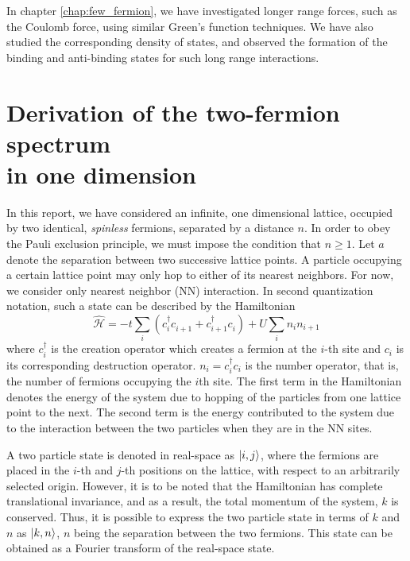 \documentclass[a4paper, 11pt]{report}
\begin{document}
In chapter \ref{chap:few_fermion}, we have investigated longer range forces, such as the Coulomb force, using similar Green's function techniques. We have also studied the corresponding density of states, and observed the formation of the binding and anti-binding states for such long range interactions.

\section{Derivation of the two-fermion spectrum\\in one dimension}\label{sec:Derivations}
In this report, we have considered an infinite, one dimensional lattice, occupied by two identical, \textit{spinless} fermions, separated by a distance $n$. In order to obey the Pauli exclusion principle, we must impose the condition that $ n \geq 1 $. Let $a$ denote the separation between two successive lattice points. A particle occupying a certain lattice point may only hop to either of its nearest neighbors. For now, we consider only nearest neighbor (NN) interaction. In second quantization notation, such a state can be described by the Hamiltonian
\begin{equation}\label{eqn:Hamiltonian}
\hat{\mathcal{H}} = -t \sum_{i}\left( c^{\dagger}_{i} c^{}_{i + 1} + c^{\dagger}_{i + 1} c^{}_{i} \right) + U \sum_{i} n_i n_{i + 1}
\end{equation}
where $c^{\dagger}_{i}$ is the creation operator which creates a fermion at the $i$-th site and $c_{i}$ is its corresponding destruction operator. $n_i = c^{\dagger}_{i} c_{i}$ is the number operator, that is, the number of fermions occupying the $i$th site. The first term in the Hamiltonian denotes the energy of the system due to hopping of the particles from one lattice point to the next. The second term is the energy contributed to the system due to the interaction between the two particles when they are in the NN sites.

A two particle state is denoted in real-space as $\ket{i, j}$, where the fermions are placed in the $i$-th and $j$-th positions on the lattice, with respect to an arbitrarily selected origin. However, it is to be noted that the Hamiltonian has complete translational invariance, and as a result, the total momentum of the system, $k$ is conserved. Thus, it is possible to express the two particle state in terms of $k$ and $n$ as $\ket{k, n}$, $n$ being the separation between the two fermions. This state can be obtained as a Fourier transform of the real-space state.
\end{document}
